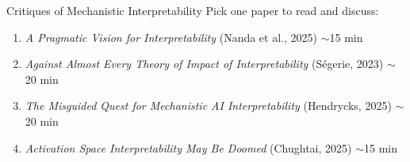 \begin{frame}{Critiques of Mechanistic Interpretability}
Pick one paper to read and discuss:
\vspace{1em}
\begin{enumerate}
\setlength{\itemsep}{0.5em}
\item \emph{A Pragmatic Vision for Interpretability} (Nanda et al., 2025) \hfill $\sim$15 min
\item \emph{Against Almost Every Theory of Impact of Interpretability} (Ségerie, 2023) \hfill $\sim$20 min
\item \emph{The Misguided Quest for Mechanistic AI Interpretability} (Hendrycks, 2025) \hfill $\sim$20 min
\item \emph{Activation Space Interpretability May Be Doomed} (Chughtai, 2025) \hfill $\sim$15 min
\end{enumerate}

\end{frame}
